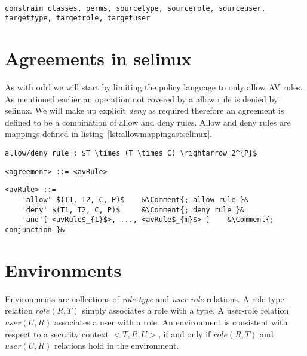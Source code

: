 \lstset{language=selinux}
\begin{lstlisting}[frame=single, caption={Constrain Rule},label={lst:constrainselinux}]

constrain classes, perms, sourcetype, sourcerole, sourceuser, targettype, targetrole, targetuser
\end{lstlisting}


\section{Agreements in \ac{selinux}}

As with \ac{odrl} we will start by limiting the policy language to only allow AV rules. As mentioned earlier an operation not covered by a allow rule is denied by \ac{selinux}. We will make up explicit \emph{deny} as required therefore an agreement is defined to be a combination of allow and deny rules. Allow and deny rules are mappings defined in listing~\ref{lst:allowmappingastselinux}.

\lstset{language=AST}
\begin{lstlisting}[frame=single, caption={'allow'/'deny' Rule as a Mapping},label={lst:allowmappingastselinux}]
allow/deny rule : $T \times (T \times C) \rightarrow 2^{P}$
\end{lstlisting}

\lstset{language=AST}
\begin{lstlisting}[frame=single, caption={\ac{selinux} Agreement},label={lst:agreementastselinux}]
<agreement> ::= <avRule> 
\end{lstlisting}


\lstset{mathescape, language=AST, escapechar=\&}  
\begin{lstlisting}[frame=single, caption={AV Rule},label={lst:avruleastselinux}]
<avRule> ::=  
	'allow' $(T1, T2, C, P)$	&\Comment{; allow rule }&
	'deny' $(T1, T2, C, P)$	    &\Comment{; deny rule }&
	'and'[ <avRule$_{1}$>, ..., <avRule$_{m}$> ]	&\Comment{; conjunction }&
\end{lstlisting}


\section{Environments}

Environments are collections of \emph{role-type} and \emph{user-role} relations. A role-type relation $role(R, T)$ simply associates a role with a type. A user-role relation $user(U, R)$ associates a user with a role. An environment is consistent with respect to a security context $<T, R, U>$, if and only if $role(R, T)$ and $user(U, R)$ relations hold in the environment. 

